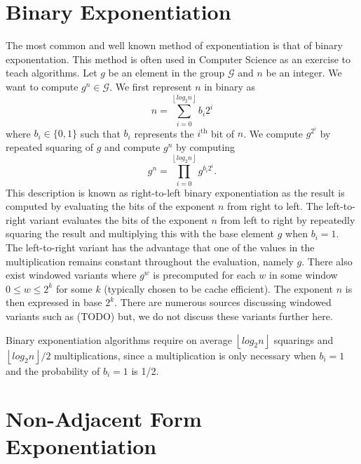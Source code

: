 \documentclass{ucalgthes1}
\theoremstyle{plain}
\theoremstyle{definition}
\newcommand{\floor}[1]{\left\lfloor #1 \right\rfloor}
\begin{document}
\section{Binary Exponentiation}\label{section:binary}
The most common and well known method of exponentiation is that of binary exponentation.  This method is often used in Computer Science as an exercise to teach algorithms.  Let $g$ be an element in the group $\mathcal G$ and $n$ be an integer.  We want to compute $g^n \in \mathcal G$.  We first represent $n$ in binary as
\[
	n = \sum_{i=0}^{\floor{log_2 n}} b_i 2^i
\]
where $b_i \in \{0, 1\}$ such that $b_i$ represents the $i^{\textrm{th}}$ bit of $n$.   We compute $g^{2^i}$ by repeated squaring of $g$ and compute $g^n$ by computing
\[
	g^n = \prod_{i=0}^{\floor{log_2 n}} g^{b_i 2^i}.
\]
This description is known as right-to-left binary exponentiation as the result is computed by evaluating the bits of the exponent $n$ from right to left.  The left-to-right variant evaluates the bits of the exponent $n$ from left to right by repeatedly squaring the result and multiplying this with the base element $g$ when $b_i = 1$.  The left-to-right variant has the advantage that one of the values in the multiplication remains constant throughout the evaluation, namely $g$.  There also exist windowed variants where $g^w$ is precomputed for each $w$ in some window $0 \le w \le 2^k$ for some $k$ (typically chosen to be cache efficient). The exponent $n$ is then expressed in base $2^k$.  There are numerous sources discussing windowed variants such as (TODO) but, we do not discuss these variants further here.

Binary exponentiation algorithms require on average $\floor{log_2 n}$ squarings and $\floor{log_2 n}/2$ multiplications, since a multiplication is only necessary when $b_i = 1$ and the probability of $b_i = 1$ is 1/2.

\bigbreak
\section{Non-Adjacent Form Exponentiation}\label{section:naf}
\end{document}
